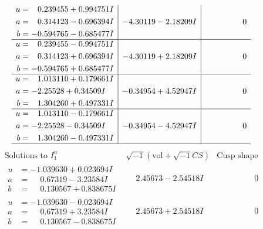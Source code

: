 \documentclass[1p]{elsarticle_modified}
\theoremstyle{definition}
\newcommand{\I}{\sqrt{-1}}
\begin{document}
$$\begin{array}{c|c|c}
\begin{aligned}
u &= \phantom{-}0.239455 + 0.994751 I \\
a &= \phantom{-}0.314123 - 0.696394 I \\
b &= -0.594765 - 0.685477 I\end{aligned}
 & -4.30119 - 2.18209 I & \phantom{-0.000000 } 0 \\ \hline\begin{aligned}
u &= \phantom{-}0.239455 - 0.994751 I \\
a &= \phantom{-}0.314123 + 0.696394 I \\
b &= -0.594765 + 0.685477 I\end{aligned}
 & -4.30119 + 2.18209 I & \phantom{-0.000000 } 0 \\ \hline\begin{aligned}
u &= \phantom{-}1.013110 + 0.179661 I \\
a &= -2.25528 + 0.34509 I \\
b &= \phantom{-}1.304260 + 0.497331 I\end{aligned}
 & -0.34954 + 4.52947 I & \phantom{-0.000000 } 0 \\ \hline\begin{aligned}
u &= \phantom{-}1.013110 - 0.179661 I \\
a &= -2.25528 - 0.34509 I \\
b &= \phantom{-}1.304260 - 0.497331 I\end{aligned}
 & -0.34954 - 4.52947 I & \phantom{-0.000000 } 0\\
 \hline 
 \end{array}$$\newpage$$\begin{array}{c|c|c}  
\text{Solutions to }I^u_{1}& \I (\text{vol} + \sqrt{-1}CS) & \text{Cusp shape}\\
 \hline 
\begin{aligned}
u &= -1.039630 + 0.023694 I \\
a &= \phantom{-}0.67319 - 3.23584 I \\
b &= \phantom{-}0.130567 + 0.838675 I\end{aligned}
 & \phantom{-}2.45673 - 2.54518 I & \phantom{-0.000000 } 0 \\ \hline\begin{aligned}
u &= -1.039630 - 0.023694 I \\
a &= \phantom{-}0.67319 + 3.23584 I \\
b &= \phantom{-}0.130567 - 0.838675 I\end{aligned}
 & \phantom{-}2.45673 + 2.54518 I & \phantom{-0.000000 } 0 \\ \hline\begin{aligned}

\end{aligned}
\end{array}$$
\end{document}
